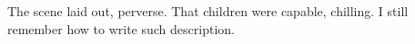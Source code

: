 

﻿The scene laid out, perverse.  That children were capable, chilling.  I still remember how to write such description.
\bye
